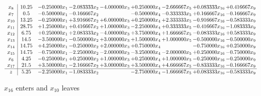 \documentclass[10pt]{article}
\begin{document}
 \[\begin{array}{c| c c@{\hskip 2pt} c@{\hskip 2pt} c@{\hskip 2pt} c@{\hskip 2pt} c@{\hskip 2pt} c@{\hskip 2pt} c@{\hskip 2pt} }
 x_{8}   &  10.25 & -0.250000 x_{1} & -2.083333 x_{2} & -4.000000 x_{3} & + 0.250000 x_{4} & -2.666667 x_{5} & + 0.083333 x_{16} & + 0.416667 x_{9}\\
 x_{7}   &  0.5 & -0.500000 x_{1} & -0.166667 x_{2} &   & -0.500000 x_{4} & -0.333333 x_{5} & + 0.166667 x_{16} & -0.166667 x_{9}\\
 x_{10}   &  13.25 & -0.250000 x_{1} & + 3.916667 x_{2} & + 6.000000 x_{3} & + 0.250000 x_{4} & + 2.333333 x_{5} & -0.916667 x_{16} & -0.583333 x_{9}\\
 x_{11}   &  28.75 & + 1.250000 x_{1} & + 0.416667 x_{2} & + 1.000000 x_{3} & -2.250000 x_{4} & + 0.333333 x_{5} & -0.416667 x_{16} & -1.083333 x_{9}\\
 x_{12}   &  6.75 & + 0.250000 x_{1} & + 2.083333 x_{2} & -4.000000 x_{3} & + 3.750000 x_{4} & + 1.666667 x_{5} & -0.083333 x_{16} & + 0.583333 x_{9}\\
 x_{13}   &  14.5 & -3.500000 x_{1} & -0.500000 x_{2} & + 3.000000 x_{3} & + 1.500000 x_{4} & + 1.000000 x_{5} & -0.500000 x_{16} & -0.500000 x_{9}\\
 x_{14}   &  14.75 & + 4.250000 x_{1} & -0.250000 x_{2} & + 2.000000 x_{3} & + 0.750000 x_{4} &   & -0.750000 x_{16} & + 0.250000 x_{9}\\
 x_{15}   &  14.75 & -0.750000 x_{1} & -2.250000 x_{2} & -2.000000 x_{3} & -3.250000 x_{4} & -2.000000 x_{5} & + 0.250000 x_{16} & -0.750000 x_{9}\\
 x_{6}   &  4.25 & -0.250000 x_{1} & + 0.250000 x_{2} & + 1.000000 x_{3} & + 0.250000 x_{4} & + 1.000000 x_{5} & -0.250000 x_{16} & -0.250000 x_{9}\\
 x_{17}   &  21.5 & + 3.500000 x_{1} & -2.166667 x_{2} & + 3.000000 x_{3} & + 3.500000 x_{4} & + 4.666667 x_{5} & -0.833333 x_{16} & -0.166667 x_{9}\\
\hline
z    &  5.25 & -2.250000 x_{1} & -1.083333 x_{2} &   & -2.750000 x_{4} & -1.666667 x_{5} & + 0.083333 x_{16} & -0.583333 x_{9}\\
\end{array}\]


 $ x_{16} $ enters and $ x_{10} $ leaves 
\end{document}
